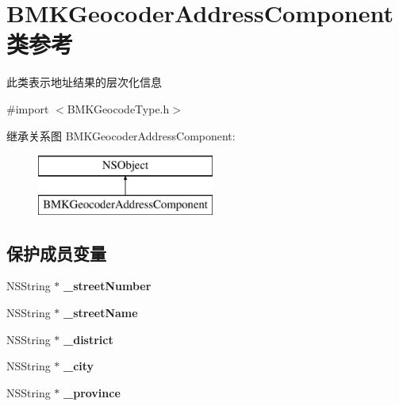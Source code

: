 \hypertarget{interface_b_m_k_geocoder_address_component}{\section{B\-M\-K\-Geocoder\-Address\-Component 类参考}
\label{interface_b_m_k_geocoder_address_component}
}


此类表示地址结果的层次化信息  




{\ttfamily \#import $<$B\-M\-K\-Geocode\-Type.\-h$>$}

继承关系图 B\-M\-K\-Geocoder\-Address\-Component\-:\begin{figure}[H]
\begin{center}
\leavevmode
\includegraphics[height=2.000000cm]{interface_b_m_k_geocoder_address_component}
\end{center}
\end{figure}
\subsection*{保护成员变量}
\begin{DoxyCompactItemize}
\item 
\hypertarget{interface_b_m_k_geocoder_address_component_a7fd13ff466169fe05af2258e9f19db9b}{N\-S\-String $\ast$ {\bfseries \-\_\-street\-Number}}\label{interface_b_m_k_geocoder_address_component_a7fd13ff466169fe05af2258e9f19db9b}

\item 
\hypertarget{interface_b_m_k_geocoder_address_component_a971b3bc2bf3025aec31a9cc645ef8114}{N\-S\-String $\ast$ {\bfseries \-\_\-street\-Name}}\label{interface_b_m_k_geocoder_address_component_a971b3bc2bf3025aec31a9cc645ef8114}

\item 
\hypertarget{interface_b_m_k_geocoder_address_component_a66bc066e8337954449951c46c36623a7}{N\-S\-String $\ast$ {\bfseries \-\_\-district}}\label{interface_b_m_k_geocoder_address_component_a66bc066e8337954449951c46c36623a7}

\item 
\hypertarget{interface_b_m_k_geocoder_address_component_a70d4ba6d9ee3fa4ea21b2d7fba95a6fe}{N\-S\-String $\ast$ {\bfseries \-\_\-city}}\label{interface_b_m_k_geocoder_address_component_a70d4ba6d9ee3fa4ea21b2d7fba95a6fe}

\item 
\hypertarget{interface_b_m_k_geocoder_address_component_ad86b02dd1ac57bee274eb70f9421e1d9}{N\-S\-String $\ast$ {\bfseries \-\_\-province}}\label{interface_b_m_k_geocoder_address_component_ad86b02dd1ac57bee274eb70f9421e1d9}

\end{DoxyCompactItemize}
